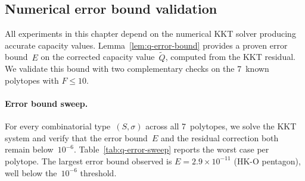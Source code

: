 %
%

\subsection{Numerical error bound validation}
\label{sec:q-error}

All experiments in this chapter depend on the numerical KKT solver
producing accurate capacity values.
Lemma~\ref{lem:q-error-bound} provides a proven error bound~$E$ on
the corrected capacity value~$\tilde{Q}$, computed from the KKT
residual.
We validate this bound with two complementary checks on the 7~known
polytopes with $F \le 10$.

\paragraph{Error bound sweep.}
For every combinatorial type~$(S,\sigma)$ across all 7~polytopes,
we solve the KKT system and verify that the error bound~$E$ and
the residual correction both remain below~$10^{-6}$.
Table~\ref{tab:q-error-sweep} reports the worst case per polytope.
The largest error bound observed is $E = 2.9 \times 10^{-11}$
(HK-O pentagon), well below the~$10^{-6}$ threshold.

